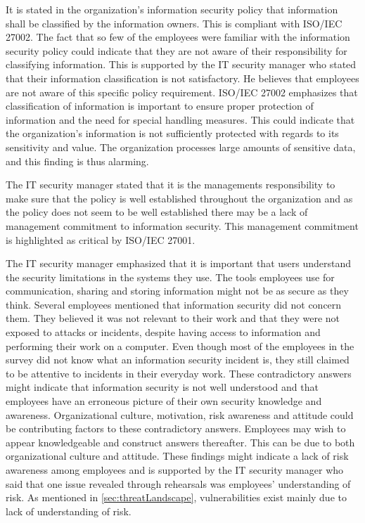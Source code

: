 It is stated in the organization's information security policy that information shall be classified by the information owners. This is compliant with ISO/IEC 27002. The fact that so few of the employees were familiar with the information security policy could indicate that they are not aware of their responsibility for classifying information. This is supported by the IT security manager who stated that their information classification is not satisfactory. He believes that employees are not aware of this specific policy requirement. ISO/IEC 27002 emphasizes that classification of information is important to ensure proper protection of information and the need for special handling measures. This could indicate that the organization's information is not sufficiently protected with regards to its sensitivity and value. The organization processes large amounts of sensitive data, and this finding is thus alarming.

The IT security manager stated that it is the managements responsibility to make sure that the policy is well established throughout the organization and as the policy does not seem to be well established there may be a lack of management commitment to information security. This management commitment is highlighted as critical by ISO/IEC 27001. 

The IT security manager emphasized that it is important that users understand the security limitations in the systems they use. The tools employees use for communication, sharing and storing information might not be as secure as they think. Several employees mentioned that information security did not concern them. They believed it was not relevant to their work and that they were not exposed to attacks or incidents, despite having access to information and performing their work on a computer. Even though most of the employees in the survey did not know what an information security incident is, they still claimed to be attentive to incidents in their everyday work. These contradictory answers might indicate that information security is not well understood and that employees have an erroneous picture of their own security knowledge and awareness. Organizational culture, motivation, risk awareness and attitude could be contributing factors to these contradictory answers. Employees may wish to appear knowledgeable and construct answers thereafter. This can be due to both organizational culture and attitude. These findings might indicate a lack of risk awareness among employees and is supported by the IT security manager who said that one issue revealed through rehearsals was employees' understanding of risk. As mentioned in \ref{sec:threatLandscape}, vulnerabilities exist mainly due to lack of understanding of risk.

